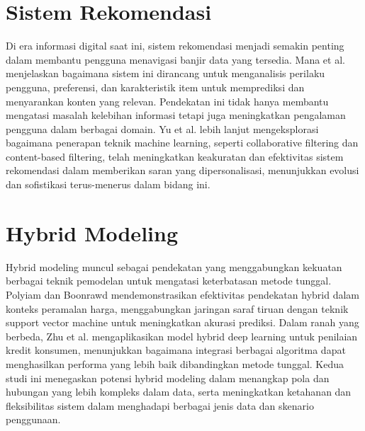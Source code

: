 \section{Sistem Rekomendasi}
Di era informasi digital saat ini, sistem rekomendasi menjadi semakin penting dalam membantu pengguna menavigasi banjir data yang tersedia. Mana et al. \cite{mana2021machine} menjelaskan bagaimana sistem ini dirancang untuk menganalisis perilaku pengguna, preferensi, dan karakteristik item untuk memprediksi dan menyarankan konten yang relevan. Pendekatan ini tidak hanya membantu mengatasi masalah kelebihan informasi tetapi juga meningkatkan pengalaman pengguna dalam berbagai domain. Yu et al. \cite{yu2021collaborative} lebih lanjut mengeksplorasi bagaimana penerapan teknik machine learning, seperti collaborative filtering dan content-based filtering, telah meningkatkan keakuratan dan efektivitas sistem rekomendasi dalam memberikan saran yang dipersonalisasi, menunjukkan evolusi dan sofistikasi terus-menerus dalam bidang ini.

\section{Hybrid Modeling}
Hybrid modeling muncul sebagai pendekatan yang menggabungkan kekuatan berbagai teknik pemodelan untuk mengatasi keterbatasan metode tunggal. Polyiam dan Boonrawd \cite{polyiam2017hybrid} mendemonstrasikan efektivitas pendekatan hybrid dalam konteks peramalan harga, menggabungkan jaringan saraf tiruan dengan teknik support vector machine untuk meningkatkan akurasi prediksi. Dalam ranah yang berbeda, Zhu et al. \cite{zhu2018hybrid} mengaplikasikan model hybrid deep learning untuk penilaian kredit konsumen, menunjukkan bagaimana integrasi berbagai algoritma dapat menghasilkan performa yang lebih baik dibandingkan metode tunggal. Kedua studi ini menegaskan potensi hybrid modeling dalam menangkap pola dan hubungan yang lebih kompleks dalam data, serta meningkatkan ketahanan dan fleksibilitas sistem dalam menghadapi berbagai jenis data dan skenario penggunaan.
